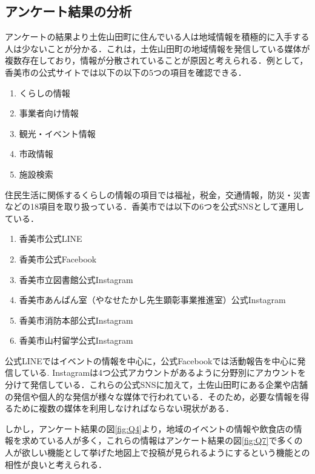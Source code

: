 \subsection{アンケート結果の分析}
アンケートの結果より土佐山田町に住んでいる人は地域情報を積極的に入手する人は少ないことが分かる．これは，土佐山田町の地域情報を発信している媒体が複数存在しており，情報が分散されていることが原因と考えられる．例として，香美市の公式サイトでは以下の以下の5つの項目を確認できる．
\begin{enumerate}
    \renewcommand{\labelenumi}{・}
    \item くらしの情報
    \item 事業者向け情報
    \item 観光・イベント情報
    \item 市政情報
    \item 施設検索
\end{enumerate}
住民生活に関係するくらしの情報の項目では福祉，税金，交通情報，防災・災害などの18項目を取り扱っている．香美市では以下の6つを公式SNSとして運用している．
\begin{enumerate}
    \renewcommand{\labelenumi}{・}
    \item 香美市公式LINE
    \item 香美市公式Facebook
    \item 香美市立図書館公式Instagram
    \item 香美市あんぱん室（やなせたかし先生顕彰事業推進室）公式Instagram
    \item 香美市消防本部公式Instagram
    \item 香美市山村留学公式Instagram
\end{enumerate}
公式LINEではイベントの情報を中心に，公式Facebookでは活動報告を中心に発信している.
Instagramは4つ公式アカウントがあるように分野別にアカウントを分けて発信している．これらの公式SNSに加えて，土佐山田町にある企業や店舗の発信や個人的な発信が様々な媒体で行われている．そのため，必要な情報を得るために複数の媒体を利用しなければならない現状がある．

しかし，アンケート結果の図\ref{fig:Q4}より，地域のイベントの情報や飲食店の情報を求めている人が多く，これらの情報はアンケート結果の図\ref{fig:Q7}で多くの人が欲しい機能として挙げた地図上で投稿が見られるようにするという機能との相性が良いと考えられる．